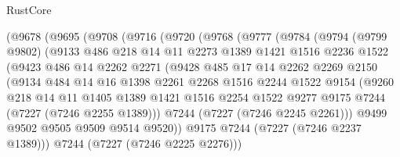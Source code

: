 \begin{lexlean}{RustCore}
\begin{coremodule}
        (@9678
          (@9695
            (@9708
              (@9716
                (@9720
                  (@9768
                    (@9777
                      (@9784
                        (@9794
                          (@9799 @9802)
                          (@9133
                            @486
                            @218
                            @14
                            @11
                            @2273
                            @1389
                            @1421
                            @1516
                            @2236
                            @1522
                            (@9423
                              @486
                              @14
                              @2262
                              @2271
                              (@9428
                                @485
                                @17
                                @14
                                @2262
                                @2269
                                @2150
                                (@9134
                                  @484
                                  @14
                                  @16
                                  @1398
                                  @2261
                                  @2268
                                  @1516
                                  @2244
                                  @1522
                                  @9154
                                  (@9260
                                    @218
                                    @14
                                    @11
                                    @1405
                                    @1389
                                    @1421
                                    @1516
                                    @2254
                                    @1522
                                    @9277
                                    @9175
                                    @7244
                                    (@7227 (@7246 @2255 @1389)))
                                  @7244
                                  (@7227 (@7246 @2245 @2261)))
                                @9499
                                @9502
                                @9505
                                @9509
                                @9514
                                @9520))
                            @9175
                            @7244
                            (@7227 (@7246 @2237 @1389)))
                          @7244
                          (@7227 (@7246 @2225 @2276)))

\end{coremodule}
\end{lexlean}
